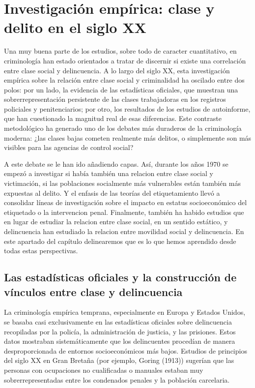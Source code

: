 \documentclass[
  spanish,
  letterpaper,
  DIV=11,
  numbers=noendperiod]{scrreprt}
\begin{document}
\section{Investigación empírica: clase y delito en el siglo
XX}\label{investigaciuxf3n-empuxedrica-clase-y-delito-en-el-siglo-xx}

Una muy buena parte de los estudios, sobre todo de caracter
cuantitativo, en criminología han estado orientados a tratar de
discernir si existe una correlación entre clase social y delincuencia. A
lo largo del siglo XX, esta investigación empírica sobre la relación
entre clase social y criminalidad ha oscilado entre dos polos: por un
lado, la evidencia de las estadísticas oficiales, que muestran una
sobrerrepresentación persistente de las clases trabajadoras en los
registros policiales y penitenciarios; por otro, los resultados de los
estudios de autoinforme, que han cuestionado la magnitud real de esas
diferencias. Este contraste metodológico ha generado uno de los debates
más duraderos de la criminología moderna: ¿las clases bajas cometen
realmente más delitos, o simplemente son más visibles para las agencias
de control social?

A este debate se le han ido añadiendo capas. Así, durante los años 1970
se empezó a investigar si había también una relacion entre clase social
y victimación, si las poblaciones socialmente más vulnerables están
también más expuestas al delito. Y el enfasis de las teorías del
etiquetamiento llevó a consolidar líneas de investigación sobre el
impacto en estatus socioeconómico del etiquetado o la intervencion
penal. Finalmente, también ha habido estudios que en lugar de estudiar
la relacion entre clase social, en un sentido estático, y delincuencia
han estudiado la relacion entre movilidad social y delincuencia. En este
apartado del capítulo delinearemos que es lo que hemos aprendido desde
todas estas perspectivas.

\subsection{Las estadísticas oficiales y la construcción de vínculos
entre clase y
delincuencia}\label{las-estaduxedsticas-oficiales-y-la-construcciuxf3n-de-vuxednculos-entre-clase-y-delincuencia}

La criminología empírica temprana, especialmente en Europa y Estados
Unidos, se basaba casi exclusivamente en las estadísticas oficiales
sobre delincuencia recopiladas por la policía, la administración de
justicia, y las prisiones. Estos datos mostraban sistemáticamente que
los delincuentes procedían de manera desproporcionada de entornos
socioeconómicos más bajos. Estudios de principios del siglo XX en Gran
Bretaña (por ejemplo, Goring (1913)) sugerían que las personas con
ocupaciones no cualificadas o manuales estaban muy sobrerrepresentadas
entre los condenados penales y la población carcelaria.
\end{document}
